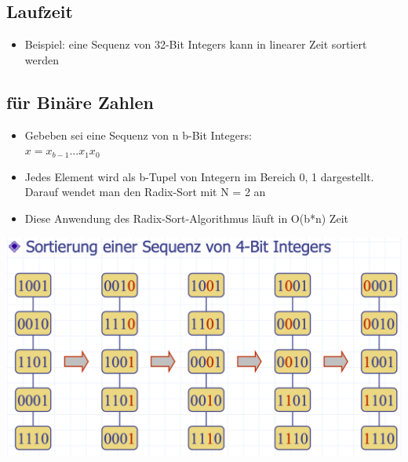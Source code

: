 \subsection{Laufzeit}
\begin{itemize}
    \item Beispiel: eine Sequenz von 32-Bit Integers kann in linearer Zeit sortiert werden
\end{itemize}

\subsection{für Binäre Zahlen}
\begin{itemize}
    \item Gebeben sei eine Sequenz von n b-Bit Integers:\\
    $x = x_{b - 1} ... x_1x_0$
    \item Jedes Element wird als b-Tupel von Integern im Bereich {0, 1} dargestellt. Darauf wendet man den Radix-Sort mit N = 2 an
    \item Diese Anwendung des Radix-Sort-Algorithmus läuft in O(b*n) Zeit
\end{itemize}


\vspace{-8pt}
\begin{center}
    \includegraphics[scale=.2]{graphic/07 RadixSort/radix.png}
\end{center}
\vspace{-8pt}



\newpage